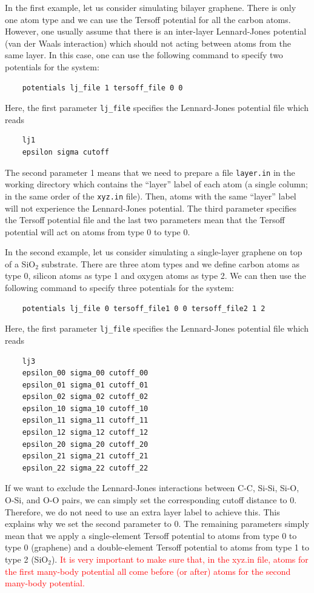\documentclass[12pt,a4paper]{report}
\begin{document}
In the first example, let us consider simulating bilayer graphene. There is only one atom type and we can use the Tersoff potential for all the carbon atoms. However, one usually assume that there is an inter-layer Lennard-Jones potential (van der Waals interaction) which should not acting between atoms from the same layer. In this case, one can use the following command to specify two potentials for the system:
\begin{verbatim}
    potentials lj_file 1 tersoff_file 0 0
\end{verbatim}
Here,  the first parameter \verb"lj_file" specifies the Lennard-Jones potential file which reads 
\begin{verbatim}
    lj1
    epsilon sigma cutoff
\end{verbatim}
The second parameter 1 means that we need to prepare a file \verb"layer.in" in the working directory which contains the ``layer'' label of each atom (a single column; in the same order of the \verb"xyz.in" file). Then, atoms with the same ``layer'' label will not experience the Lennard-Jones potential. The third parameter specifies the Tersoff potential file and the last two parameters mean that the Tersoff potential will act on atoms from type 0 to type 0.


In the second example, let us consider simulating a single-layer graphene on top of a SiO$_2$ substrate. There are three atom types and we define carbon atoms as type 0, silicon atoms as type 1 and oxygen atoms as type 2. We can then use the following command to specify three potentials for the system:
\begin{verbatim}
    potentials lj_file 0 tersoff_file1 0 0 tersoff_file2 1 2
\end{verbatim}
Here,  the first parameter \verb"lj_file" specifies the Lennard-Jones potential file which reads 
\begin{verbatim}
    lj3
    epsilon_00 sigma_00 cutoff_00
    epsilon_01 sigma_01 cutoff_01
    epsilon_02 sigma_02 cutoff_02
    epsilon_10 sigma_10 cutoff_10
    epsilon_11 sigma_11 cutoff_11
    epsilon_12 sigma_12 cutoff_12
    epsilon_20 sigma_20 cutoff_20
    epsilon_21 sigma_21 cutoff_21
    epsilon_22 sigma_22 cutoff_22
\end{verbatim}
If we want to exclude the Lennard-Jones interactions between C-C, Si-Si, Si-O, O-Si, and O-O pairs, we can simply set the corresponding cutoff distance to 0. Therefore, we do not need to use an extra layer label to achieve this. This explains why we set the second parameter to 0. The remaining parameters simply mean that we apply a single-element Tersoff potential to atoms from type 0 to type 0 (graphene) and a double-element Tersoff potential to atoms from type 1 to type 2 (SiO$_2$). \textcolor{red}{It is very important to make sure that, in the xyz.in file, atoms for the first many-body potential all come before (or after) atoms for the second many-body potential.}
\end{document}
